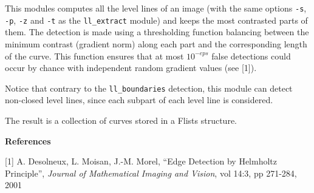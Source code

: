 This modules computes all the level lines of an image 
(with the same options \verb+-s+, \verb+-p+, \verb+-z+ and \verb+-t+ 
as the \verb+ll_extract+ module) and keeps the most contrasted parts of them.
The detection is made using a thresholding function balancing between 
the minimum contrast (gradient norm) along each part and the
corresponding length of the curve. This function ensures
that at most $10^{-eps}$ false detections could occur by chance
with independent random gradient values (see [1]).

\medskip

Notice that contrary to the \verb+ll_boundaries+ detection, this 
module can detect non-closed level lines, since each subpart of each
level line is considered.

\medskip

The result is a collection of curves stored in a Flists structure.

\bigskip

{\large \bf References}

\medskip

[1] A. Desolneux, L. Moisan, J.-M. Morel, ``Edge Detection by Helmholtz 
Principle'', {\it Journal of Mathematical Imaging and Vision}, 
vol 14:3, pp 271-284, 2001

